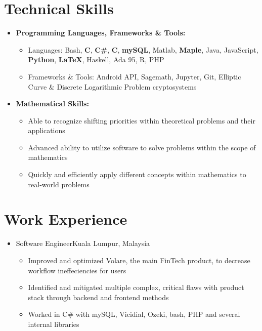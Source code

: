 \documentclass[10pt,letterpaper,sans]{moderncv}
\renewcommand{\_}{\textscale{.7}{\textunderscore}}
\newcommand{\Rplus}{\protect\hspace{-.1em}\protect\raisebox{.35ex}{\smaller{\smaller\textbf{+}}}}
\newcommand{\Cpp}{\mbox{C\Rplus\Rplus}\xspace}
\begin{document}
\section{Technical Skills}
\vspace{0.75em}
\begin{itemize}
\item \textbf{Programming Languages, Frameworks \& Tools:}
\begin{itemize}
    \item {Languages:} Bash, \textbf{C}, \textbf{C\#}, \textbf{\Cpp}, \textbf{mySQL}, Matlab, \textbf{Maple}, Java, JavaScript, \textbf{Python}, \textbf{\LaTeX}, Haskell, Ada 95, R, PHP
    \item {Frameworks \& Tools:} Android API, Sagemath, Jupyter, Git, Elliptic Curve \& Discrete Logarithmic Problem cryptosystems
\end{itemize}
\vspace{0.5em}
\item \textbf{Mathematical Skills:}
\begin{itemize}
    \item Able to recognize shifting priorities within theoretical problems and their applications
    \item Advanced ability to utilize software to solve problems within the scope of mathematics
    \item Quickly and efficiently apply different concepts within mathematics to real-world problems
\end{itemize}
\end{itemize}
\vspace{0.5em}

\section{Work Experience}
\vspace{0.75em}
\begin{itemize}
\item{
  {Software Engineer}{Kuala Lumpur, Malaysia}{}{
    \begin{itemize}
    \item Improved and optimized Volare, the main FinTech product, to decrease workflow ineffeciencies for users
    \item Identified and mitigated multiple complex, critical flaws with product stack through backend and frontend methods
    \item Worked in C\# with mySQL, Vicidial, Ozeki, bash, PHP and several internal libraries
    \end{itemize}
}}
\end{itemize}
\end{document}
